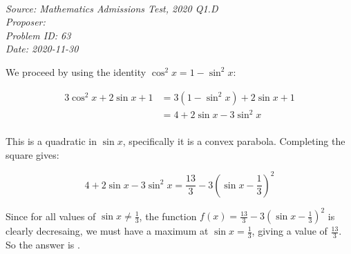 \SSbreak\\
\emph{Source: Mathematics Admissions Test, 2020 Q1.D}\\
\emph{Proposer: \Pss}\\
\emph{Problem ID: 63}\\
\emph{Date: 2020-11-30}\\
\SSbreak

\bigskip

\begin{solution}\hfil\medskip
    
    We proceed by using the identity \(\cos^2x=1-\sin^2x\):

    \begin{align*}
        3\cos^2x+2\sin x+1&=3(1-\sin^2x)+2\sin x+1\\
        &=4+2\sin x-3\sin^2x\\
    \end{align*}

    This is a quadratic in \(\sin x\), specifically it is a convex parabola. Completing the square gives:

    \begin{equation*}
        4+2\sin x-3\sin^2x=\frac{13}{3}-3\left(\sin x-\frac{1}{3} \right)^2
    \end{equation*}

    Since for all values of \(\sin x\ne\frac{1}{3}\), the function \(f(x)=\frac{13}{3}-3\left(\sin x-\frac{1}{3}\right)^2\) is clearly decresaing, we must have a maximum at \(\sin x=\frac{1}{3}\), giving a value of \(\frac{13}{3}\). So the answer is .

\end{solution}\bigskip

